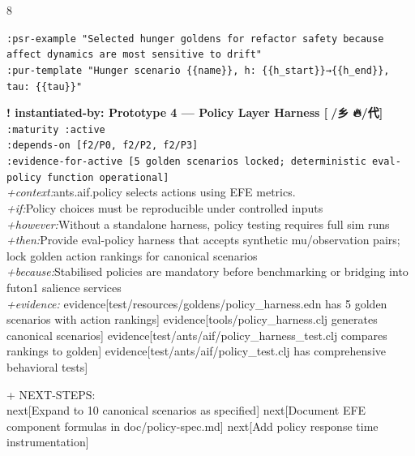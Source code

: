 \documentclass[landscape]{article}
\newcommand{\flexitag}[1]{\textcolor[gray]{0.35}{\textit{#1}}}
\newenvironment{devmapactive}{%
  \def\FrameCommand{\colorbox{devmapactivebg}}%
  \setlength{\fboxsep}{2pt}%
  \MakeFramed{\advance\hsize-\width \FrameRestore}%
}{\endMakeFramed}
\begin{document}
\begin{paracol}{8}
\begin{devmapactive}
\par
  \texttt{:\allowbreak{}psr-\allowbreak{}example "Selected hunger goldens for refactor safety because affect dynamics are most sensitive to drift"}\\
  \texttt{:\allowbreak{}pur-\allowbreak{}template "Hunger scenario \{\{name\}\},\allowbreak{} h:\allowbreak{} \{\{h\_\allowbreak{}start\}\}→\{\{h\_\allowbreak{}end\}\},\allowbreak{} tau:\allowbreak{} \{\{tau\}\}"}\\
\par
\par
\end{devmapactive}
\begin{devmapactive}
\textbf{! instantiated-by: Prototype 4 — Policy Layer Harness [🍲/乡 🔥/代]}\\
  \texttt{:\allowbreak{}maturity :\allowbreak{}active}\\
  \texttt{:\allowbreak{}depends-\allowbreak{}on [f2/\allowbreak{}P0,\allowbreak{} f2/\allowbreak{}P2,\allowbreak{} f2/\allowbreak{}P3]}\\
  \texttt{:\allowbreak{}evidence-\allowbreak{}for-\allowbreak{}active [5 golden scenarios locked;\allowbreak{} deterministic eval-\allowbreak{}policy function operational]}\\
  \flexitag{+context:}ants.aif.policy selects actions using EFE metrics.\\
  \flexitag{+if:}Policy choices must be reproducible under controlled inputs\\
  \flexitag{+however:}Without a standalone harness, policy testing requires full sim runs\\
  \flexitag{+then:}Provide eval-policy harness that accepts synthetic mu/observation pairs; lock golden action rankings for canonical scenarios\\
  \flexitag{+because:}Stabilised policies are mandatory before benchmarking or bridging into futon1 salience services\\
  \flexitag{+evidence:} evidence[test/resources/goldens/policy\_harness.edn has 5 golden scenarios with action rankings] evidence[tools/policy\_harness.clj generates canonical scenarios] evidence[test/ants/aif/policy\_harness\_test.clj compares rankings to golden] evidence[test/ants/aif/policy\_test.clj has comprehensive behavioral tests]\\
\par
  + NEXT-STEPS:\\
    next[Expand to 10 canonical scenarios as specified] next[Document EFE component formulas in doc/policy-spec.md] next[Add policy response time instrumentation]\\

\end{devmapactive}
\end{paracol}
\end{document}
